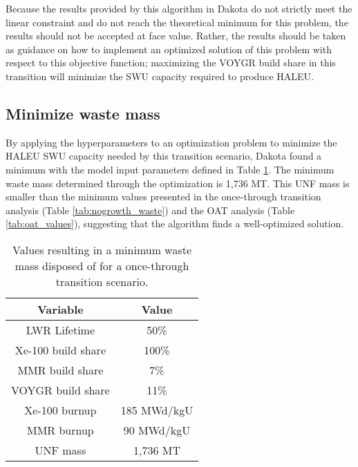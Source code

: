 Because the results provided by this algorithm in Dakota do not strictly 
meet the linear constraint and do not reach the theoretical minimum for 
this problem, the results should not be accepted at face value. 
Rather, the results should be taken as guidance on how to implement an 
optimized solution of this problem 
with respect to this objective function; maximizing the VOYGR build share in 
this transition will minimize the \gls{SWU} capacity required to produce 
\gls{HALEU}.  

\subsection{Minimize waste mass}
By applying the hyperparameters to an optimization problem to minimize the 
\gls{HALEU} \gls{SWU} capacity needed by this transition scenario, Dakota
found a minimum with the model input parameters defined in Table 
\ref{tab:soga_ot_waste}. The minimum waste mass determined through the 
optimization is 1,736 MT. This \gls{UNF} mass is smaller than the minimum 
values presented in the once-through transition 
analysis (Table \ref{tab:nogrowth_waste}) and the \gls{OAT} analysis 
(Table \ref{tab:oat_values}), suggesting that the algorithm finds 
a well-optimized solution. 

\begin{table}[h!]
    \centering 
    \caption{Values resulting in a minimum waste mass disposed of for 
              a once-through transition scenario.}
    \label{tab:soga_ot_waste}
    \begin{tabular}{c c}
        \hline
        Variable & Value \\
        \hline
        LWR Lifetime & 50\%\\
        Xe-100 build share & 100\%\\
        MMR build share & 7\%\\
        VOYGR build share & 11\%\\
        Xe-100 burnup & 185 MWd/kgU\\
        MMR burnup & 90 MWd/kgU\\
        \hline
        UNF mass & 1,736 MT \\
        \hline
    \end{tabular}
\end{table}

